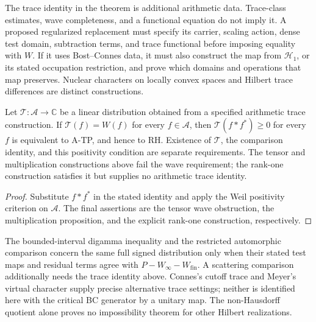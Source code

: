 \begin{remark}
\label{v4-arith:w7-j:rem:identification-buys}
The trace identity in the theorem is additional arithmetic data.
Trace-class estimates, wave completeness, and a functional equation
do not imply it. A proposed regularized replacement must specify
its carrier, scaling action, dense test domain, subtraction terms,
and trace functional before imposing equality with \(W\).
If it uses Bost--Connes data, it must also construct the map from
\(\mathcal H_1\), or its stated occupation restriction, and prove
which domains and operations that map preserves. Nuclear characters
on locally convex spaces and Hilbert trace differences are distinct
constructions.
\end{remark}

\begin{proposition}
\label{v4-arith:w7-j:thm:obstruction-located}
Let \(\mathcal T:\mathscr A\to\mathbb C\) be a linear distribution
obtained from a specified arithmetic trace construction.
If \(\mathcal T(f)=W(f)\) for every \(f\in\mathscr A\), then
\(\mathcal T(f*f^*)\geq0\) for every \(f\) is equivalent to A-TP,
and hence to RH. Existence of \(\mathcal T\), the comparison
identity, and this positivity condition are separate requirements.
The tensor and multiplication constructions above fail the wave
requirement; the rank-one construction satisfies it but supplies
no arithmetic trace identity.
\end{proposition}
\begin{proof}
Substitute \(f*f^*\) in the stated identity and apply the Weil
positivity criterion on \(\mathscr A\). The final assertions are
the tensor wave obstruction, the multiplication proposition, and
the explicit rank-one construction, respectively.
\end{proof}

\begin{remark}
\label{v4-arith:w7-j:rem:three-reductions}
The bounded-interval digamma inequality and the restricted
automorphic comparison concern the same full signed distribution
only when their stated test maps and residual terms agree with
\(P-W_\infty-W_{\mathrm{fin}}\).
A scattering comparison additionally needs the trace identity above.
Connes's cutoff trace and Meyer's virtual character supply precise
alternative trace settings; neither is identified here with the
critical BC generator by a unitary map. The non-Hausdorff quotient
alone proves no impossibility theorem for other Hilbert realizations.
\end{remark}

